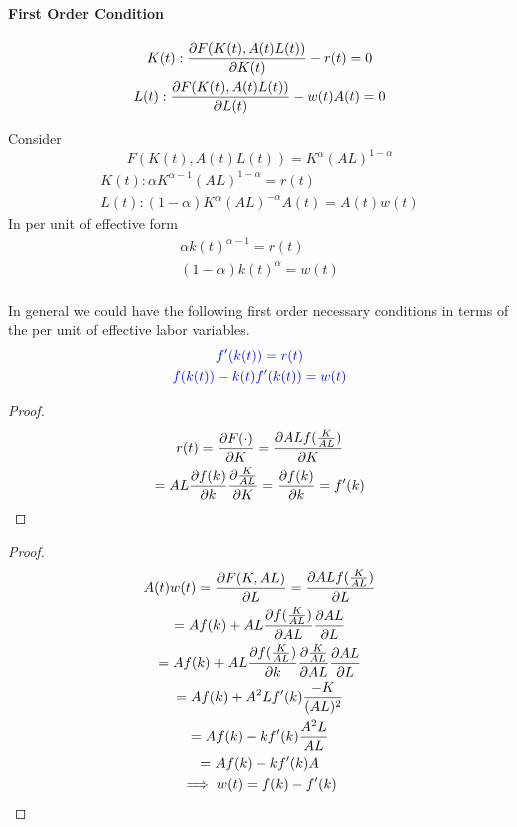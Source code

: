 \documentclass[]{article}
\begin{document}
			\paragraph{First Order Condition}
			\begin{gather*}
				K(t) : \frac{\partial{F(K(t), A(t)L(t))}}{\partial{K(t)}} - r(t) = 0 \\
				L(t) : \frac{\partial{F(K(t), A(t)L(t))}}{\partial{L(t)}} - w(t)A(t) = 0
			\end{gather*}
			
			\begin{example}
				Consider 
				\[
					F(K(t), A(t)L(t)) = K^\alpha (AL)^{1-\alpha}
				\]
				\begin{gather*}
					K(t) : \alpha K^{\alpha - 1} (AL)^{1-\alpha} = r(t)\\
					L(t) : (1-\alpha) K^\alpha (AL)^{-\alpha}A(t) =A(t) w(t)
				\end{gather*}
				In per unit of effective form
				\begin{gather*}
					\alpha k(t) ^ {\alpha - 1} = r(t) \\
					(1-\alpha) k(t) ^ \alpha = w(t) \\
				\end{gather*}
			\end{example}
			In general we could have the following first order necessary conditions in terms of the per unit of effective labor variables.
			\begin{gather*}
			\textcolor{blue}{
				f'(k(t)) = r(t)
			} \\
			\textcolor{blue}{
				f(k(t)) - k(t) f'(k(t)) = w(t)
			}
			\end{gather*}
			
			\begin{proof}
    			\begin{gather*}
    			    r(t) = \frac{\partial{F(\cdot)}}{\partial{K}} 
    			    = \frac{\partial{AL f(\frac{K}{AL})}}{\partial{K}} \\
    			    = AL \frac{\partial{f(k)}}{\partial{k}} \frac{\partial{\frac{K}{AL}}}{\partial{K}} 
    			    = \frac{\partial{f(k)}}{\partial{k}} 
    			    = f'(k)
    			\end{gather*}
			\end{proof}
			
			\begin{proof}
                \begin{gather*}
                    A(t)w(t) = \frac{\partial{F(K, AL)}}{\partial{L}} = \frac{\partial{AL f(\frac{K}{AL})}}{\partial{L}} \\
                    = Af(k) + AL \frac{\partial{f(\frac{K}{AL})}}{\partial{AL}} \frac{\partial{AL}}{\partial{L}} \\
                    = Af(k) + AL \frac{\partial{f(\frac{K}{AL})}}{\partial{k}} \frac{\partial{\frac{K}{AL}}}{\partial{AL}} \frac{\partial{AL}}{\partial{L}} \\
                    = Af(k) + A^2 L f'(k) \frac{-K}{(AL)^2} \\
                    = Af(k) - k f'(k) \frac{A^2 L}{AL} \\
                    = Af(k) - k f'(k) A \\
                    \implies w(t) = f(k) - f'(k)
                \end{gather*}
			\end{proof}
			
\end{document}
